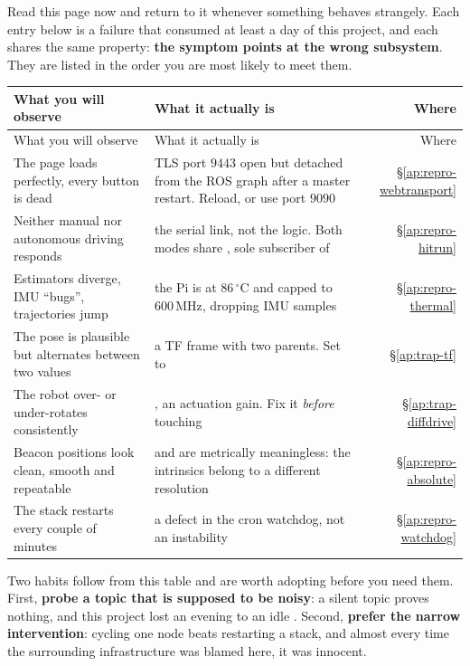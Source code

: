 Read this page now and return to it whenever something behaves strangely.
Each entry below is a failure that consumed at least a day of this project,
and each shares the same property: \textbf{the symptom points at the wrong
subsystem}. They are listed in the order you are most likely to meet them.

{\small\linespread{1.06}\selectfont
\setlength{\LTleft}{0pt}\setlength{\LTright}{0pt}
\begin{longtable}{@{}L{6.3cm}L{6.6cm}r@{}}
\toprule
What you will observe & What it actually is & Where \\
\midrule
\endfirsthead
\toprule
What you will observe & What it actually is & Where \\
\midrule
\endhead
\bottomrule
\endlastfoot
The page loads perfectly, every button is dead
  & TLS port $9443$ open but detached from the ROS graph after a master
    restart. Reload, or use port $9090$
  & \S\ref{ap:repro-webtransport} \\
\addlinespace
Neither manual nor autonomous driving responds
  & the serial link, not the logic. Both modes share
    , sole subscriber of 
  & \S\ref{ap:repro-hitrun} \\
\addlinespace
Estimators diverge, IMU ``bugs'', trajectories jump
  & the Pi is at $86\,^\circ$C and capped to $600$\,MHz, dropping IMU samples
  & \S\ref{ap:repro-thermal} \\
\addlinespace
The pose is plausible but alternates between two values
  & a TF frame with two parents. Set  to
  & \S\ref{ap:trap-tf} \\
\addlinespace
The robot over- or under-rotates consistently
  & , an actuation gain. Fix it
    \emph{before} touching 
  & \S\ref{ap:trap-diffdrive} \\
\addlinespace
Beacon positions look clean, smooth and repeatable
  & and are metrically meaningless: the intrinsics belong to a different
    resolution
  & \S\ref{ap:repro-absolute} \\
\addlinespace
The stack restarts every couple of minutes
  & a  defect in the cron watchdog, not an instability
  & \S\ref{ap:repro-watchdog} \\
\end{longtable}}

\noindent Two habits follow from this table and are worth adopting before you
need them. First, \textbf{probe a topic that is supposed to be noisy}: a
silent topic proves nothing, and this project lost an evening to an idle
. Second, \textbf{prefer the narrow intervention}: cycling
one node beats restarting a stack, and almost every time the surrounding
infrastructure was blamed here, it was innocent.

